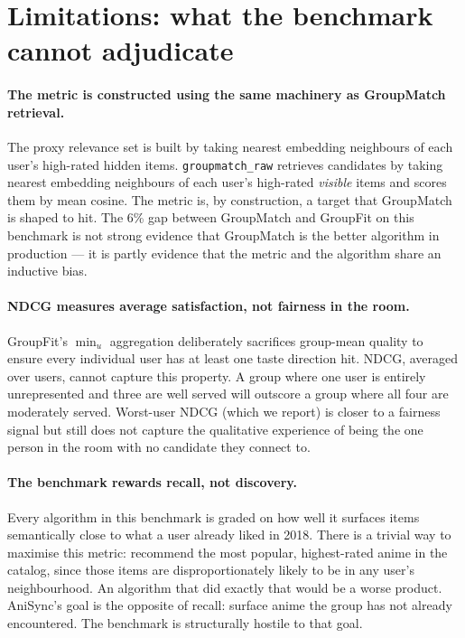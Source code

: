 \documentclass[11pt]{article}
\begin{document}
\section{Limitations: what the benchmark cannot adjudicate}
\label{sec:limits}

\paragraph{The metric is constructed using the same machinery as
GroupMatch retrieval.}
The proxy relevance set is built by taking nearest embedding neighbours
of each user's high-rated hidden items. \texttt{groupmatch\_raw}
retrieves candidates by taking nearest embedding neighbours of each
user's high-rated \emph{visible} items and scores them by mean cosine.
The metric is, by construction, a target that GroupMatch is shaped
to hit. The 6\% gap between GroupMatch and GroupFit on this benchmark
is not strong evidence that GroupMatch is the better algorithm in
production --- it is partly evidence that the metric and the algorithm
share an inductive bias.

\paragraph{NDCG measures average satisfaction, not fairness in the room.}
GroupFit's $\min_u$ aggregation deliberately sacrifices group-mean
quality to ensure every individual user has at least one taste direction
hit. NDCG, averaged over users, cannot capture this property. A group
where one user is entirely unrepresented and three are well served
will outscore a group where all four are moderately served. Worst-user
NDCG (which we report) is closer to a fairness signal but still does
not capture the qualitative experience of being the one person in the
room with no candidate they connect to.

\paragraph{The benchmark rewards recall, not discovery.}
Every algorithm in this benchmark is graded on how well it surfaces
items semantically close to what a user already liked in 2018. There
is a trivial way to maximise this metric: recommend the most popular,
highest-rated anime in the catalog, since those items are
disproportionately likely to be in any user's neighbourhood. An
algorithm that did exactly that would be a worse product. AniSync's
goal is the opposite of recall: surface anime the group has not
already encountered. The benchmark is structurally hostile to that
goal.
\end{document}
